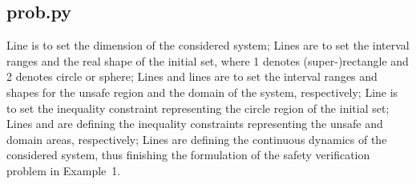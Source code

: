 \documentclass{llncs}
\begin{document}
\subsection{\textsf{prob.py}}
Line
is to set the dimension of the considered system; Lines
are to set the interval ranges and the real shape of the initial set, where 1 denotes (super-)rectangle and 
2 denotes circle or sphere; Lines
and lines
are to set the interval ranges and shapes for the unsafe region and the domain of the system, respectively;
Line 
is to set the inequality constraint representing the circle region of the initial set; Lines
and 
are defining the inequality constraints representing the unsafe and domain areas, respectively;
Lines
are defining the continuous dynamics of the considered system, thus finishing the formulation of the
safety verification problem in Example~1.
\end{document}
